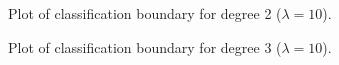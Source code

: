 \documentclass{article}
\begin{document}
\begin{itemize}
    \begin{figure}[H]
 \caption{Plot of classification boundary for degree 2 ($\lambda=10$).}
 \label{fig:13}
 \end{figure}
     \begin{figure}[H]
 \caption{Plot of classification boundary for degree 3 ($\lambda=10$).}
 \label{fig:14}
 \end{figure}
 

\end{itemize}
\end{document}
